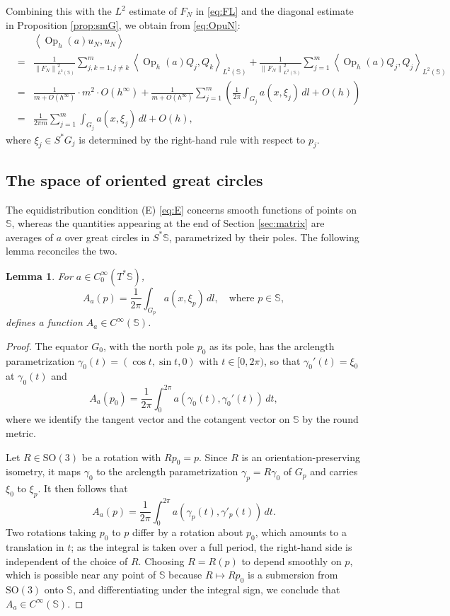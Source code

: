 \documentclass[12pt,reqno]{amsart}
\DeclareMathOperator{\Op}{Op}
\newcommand{\Sb}{\mathbb{S}}
\newcommand{\SO}{\mathrm{SO}}
\theoremstyle{plain}
\newtheorem{lemma}[thm]{Lemma}
\theoremstyle{definition}
\theoremstyle{remark}
\numberwithin{equation}{section}
\begin{document}
Combining this with the $L^2$ estimate of $F_N$ in \eqref{eq:FL} and the diagonal estimate in Proposition \ref{prop:smG}, we obtain from \eqref{eq:OpuN}:
\begin{eqnarray*}
&&\left\langle\Op_h(a)u_N,u_N\right\rangle\\
&=&\frac{1}{\left\|F_N\right\|_{L^2(\Sb)}^2}\sum_{j,k=1,j\ne k}^m\left\langle\Op_h(a)Q_j,Q_k\right\rangle_{L^2(\Sb)}+\frac{1}{\left\|F_N\right\|_{L^2(\Sb)}^2}\sum_{j=1}^m\left\langle\Op_h(a)Q_j,Q_j\right\rangle_{L^2(\Sb)}\\
&=&\frac{1}{m+O\left(h^\infty\right)}\cdot m^2\cdot O\left(h^\infty\right)+\frac{1}{m+O\left(h^\infty\right)}\sum_{j=1}^m\left(\frac{1}{2\pi}\int_{G_j}a\left(x,\xi_j\right)\,dl+O(h)\right)\\
&=&\frac{1}{2\pi m}\sum_{j=1}^m\int_{G_j}a\left(x,\xi_j\right)\,dl+O(h),
\end{eqnarray*}
where $\xi_j\in S^*G_j$ is determined by the right-hand rule with respect to $p_j$.

\subsection{The space of oriented great circles}\label{sec:circle}
The equidistribution condition (E) \eqref{eq:E} concerns smooth functions of points on $\Sb$, whereas the quantities appearing at the end of Section \ref{sec:matrix} are averages of $a$ over great circles in $S^*\Sb$, parametrized by their poles. The following lemma reconciles the two.

\begin{lemma}\label{lemma:avg}
For $a\in C_0^\infty(T^*\Sb)$,
$$A_a(p)=\frac{1}{2\pi}\int_{G_p}a\left(x,\xi_p\right)\,dl,\quad\text{where }p\in\Sb,$$
defines a function $A_a\in C^\infty(\Sb)$. 
\end{lemma}

\begin{proof}
The equator $G_0$, with the north pole $p_0$ as its pole, has the arclength parametrization $\gamma_0(t)=(\cos t,\sin t,0)$ with $t\in[0,2\pi)$, so that $\gamma_0'(t)=\xi_0$ at $\gamma_0(t)$ and
$$A_a\left(p_0\right)=\frac{1}{2\pi}\int_0^{2\pi}a\left(\gamma_0(t),\gamma_0'(t)\right)\,dt,$$
where we identify the tangent vector and the cotangent vector on $\Sb$ by the round metric.

Let $R\in\SO(3)$ be a rotation with $Rp_0=p$. Since $R$ is an orientation-preserving isometry, it maps $\gamma_0$ to the arclength parametrization $\gamma_p=R\gamma_0$ of $G_p$ and carries $\xi_0$ to $\xi_p$. It then follows that
$$A_a(p)=\frac{1}{2\pi}\int_0^{2\pi}a\left(\gamma_p(t),\gamma'_p(t)\right)\,dt.$$
Two rotations taking $p_0$ to $p$ differ by a rotation about $p_0$, which amounts to a translation in $t$; as the integral is taken over a full period, the right-hand side is independent of the choice of $R$. Choosing $R=R(p)$ to depend smoothly on $p$, which is possible near any point of $\Sb$ because $R\mapsto Rp_0$ is a submersion from $\SO(3)$ onto $\Sb$, and differentiating under the integral sign, we conclude that $A_a\in C^\infty(\Sb)$.
\end{proof}
\end{document}
